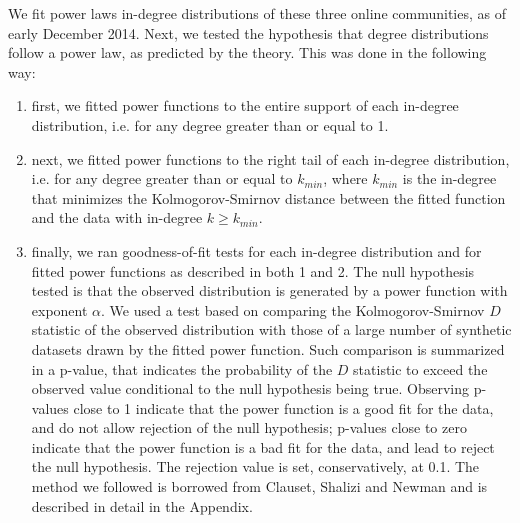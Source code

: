 \documentclass{nws}
\begin{document}
We fit power laws in-degree distributions of these three online communities, as of early December 2014. Next, we tested the hypothesis that degree distributions follow a power law, as predicted by the theory. This was done in the following way:
\begin{enumerate}
\item first, we fitted power functions to the entire support of each in-degree distribution, i.e. for any degree greater than or equal to 1. 
\item next, we fitted power functions to the right tail of each in-degree distribution, i.e. for any degree greater than or equal to $k_{min}$, where $k_{min}$ is the in-degree that minimizes the Kolmogorov-Smirnov distance between the fitted function and the data with in-degree $k \geq k_{min}$.
\item finally, we ran goodness-of-fit tests for each in-degree distribution and for fitted power functions as described in both 1 and 2. The null hypothesis tested is that the observed distribution is generated by a power function with exponent $\alpha$. We used a test based on comparing the Kolmogorov-Smirnov $D$ statistic of the observed distribution with those of a large number of synthetic datasets drawn by the fitted power function. Such comparison is summarized in a p-value, that indicates the probability of the $D$ statistic to exceed the observed value conditional to the null hypothesis being true. Observing p-values close to 1 indicate that the power function is a good fit for the data, and do not allow rejection of the null hypothesis; p-values close to zero indicate that the power function is a bad fit for the data, and lead to reject the null hypothesis. The rejection value is set, conservatively, at 0.1.  The method we followed is borrowed from Clauset, Shalizi and Newman \cite{clauset2009power} and is described in detail in the Appendix. 
\end{enumerate}
	
\end{document}
